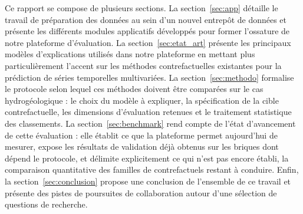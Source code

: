 Ce rapport se compose de plusieurs sections. La section~\ref{sec:app} détaille le travail de préparation des données au sein d'un nouvel entrepôt de données et présente les différents modules applicatifs développés pour former l'ossature de notre plateforme d'évaluation. La section~\ref{sec:etat_art} présente les principaux modèles d'explications utilisés dans notre plateforme en mettant plus particulièrement l'accent sur les méthodes contrefactuelles existantes pour la prédiction de séries temporelles multivariées. La section~\ref{sec:methodo} formalise le protocole selon lequel ces méthodes doivent être comparées sur le cas hydrogéologique : le choix du modèle à expliquer, la spécification de la cible contrefactuelle, les dimensions d'évaluation retenues et le traitement statistique des classements. La section~\ref{sec:benchmark} rend compte de l'état d'avancement de cette évaluation : elle établit ce que la plateforme permet aujourd'hui de mesurer, expose les résultats de validation déjà obtenus sur les briques dont dépend le protocole, et délimite explicitement ce qui n'est pas encore établi, la comparaison quantitative des familles de contrefactuels restant à conduire. Enfin, la section~\ref{sec:conclusion} propose une conclusion de l'ensemble de ce travail et présente des pistes de poursuites de collaboration autour d'une sélection de questions de recherche.
